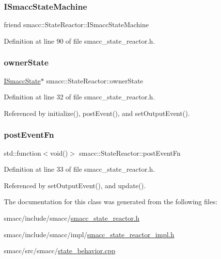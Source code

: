 \subsubsection{\texorpdfstring{I\+Smacc\+State\+Machine}{ISmaccStateMachine}}
{\footnotesize\ttfamily friend smacc\+::\+State\+Reactor\+::\+I\+Smacc\+State\+Machine\hspace{0.3cm}{\ttfamily [private]}}



Definition at line 90 of file smacc\+\_\+state\+\_\+reactor.\+h.

\mbox{\label{classsmacc_1_1StateReactor_aabd30af9412a8fea9ec5906f173d9d4a}} 
\subsubsection{\texorpdfstring{owner\+State}{ownerState}}
{\footnotesize\ttfamily \hyperlink{classsmacc_1_1ISmaccState}{I\+Smacc\+State}$\ast$ smacc\+::\+State\+Reactor\+::owner\+State}



Definition at line 32 of file smacc\+\_\+state\+\_\+reactor.\+h.



Referenced by initialize(), post\+Event(), and set\+Output\+Event().

\mbox{\label{classsmacc_1_1StateReactor_a1d97ae5c1689b6716c60c19c94a7eeae}} 
\subsubsection{\texorpdfstring{post\+Event\+Fn}{postEventFn}}
{\footnotesize\ttfamily std\+::function$<$void()$>$ smacc\+::\+State\+Reactor\+::post\+Event\+Fn}



Definition at line 33 of file smacc\+\_\+state\+\_\+reactor.\+h.



Referenced by set\+Output\+Event(), and update().



The documentation for this class was generated from the following files\+:\begin{DoxyCompactItemize}
\item 
smacc/include/smacc/\hyperlink{smacc__state__reactor_8h}{smacc\+\_\+state\+\_\+reactor.\+h}\item 
smacc/include/smacc/impl/\hyperlink{smacc__state__reactor__impl_8h}{smacc\+\_\+state\+\_\+reactor\+\_\+impl.\+h}\item 
smacc/src/smacc/\hyperlink{state__behavior_8cpp}{state\+\_\+behavior.\+cpp}\end{DoxyCompactItemize}
